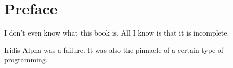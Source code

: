 \chapter{Preface} 
I don't even know what this book is. All I know is that it is incomplete.

Iridis Alpha was a failure. It was also the pinnacle of a certain type of programming.

